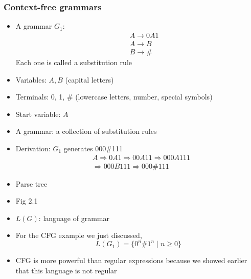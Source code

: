 \begin{frame}[allowframebreaks] \frametitle{Context-free grammars}
  \begin{itemize}
  \item
    A grammar $G_1$:
\begin{eqnarray*}
  && A \rightarrow 0A1\\
&& A \rightarrow B\\
&& B \rightarrow \#
\end{eqnarray*}
Each one is called a substitution rule
\item Variables: $A,B$ (capital letters)
\item Terminals: 0, 1, \# (lowercase letters,
number, special symbols)
\item Start variable: $A$
\item A grammar: a collection of substitution rules
\item Derivation: $G_1$ generates 
000\#111
\begin{equation*}
  \begin{split}
&  A
\Rightarrow 0A1 \Rightarrow
00A11 
\Rightarrow 000A111\\
& 
\Rightarrow 000B111
\Rightarrow 000\#111
\end{split}
\end{equation*}
\item Parse tree

\item [] Fig 2.1

\framebreak  

\item $L(G)$: language of grammar
\item For the CFG example we just discussed, 
  \begin{equation*}
L(G_1) = 
\{0^n \#  1^n\mid n \geq 0\}
\end{equation*}

\item CFG is more powerful than regular expressions because we showed earlier
that this language is not regular


\end{itemize}
\end{frame}
